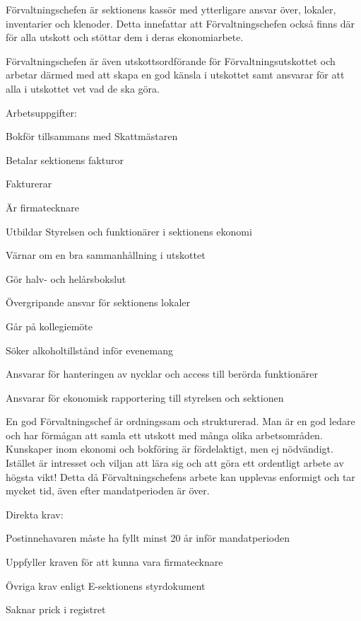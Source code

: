 \documentclass[10pt]{article}
\def\post{Förvaltningschef}
\def\doctitle{Kravprofil för \post}
\begin{document}
\heading{\doctitle}

Förvaltningschefen är sektionens kassör med ytterligare ansvar över, lokaler, inventarier och klenoder. Detta innefattar att Förvaltningschefen också finns där för alla utskott och stöttar dem i deras ekonomiarbete. 

Förvaltningschefen är även utskottsordförande för Förvaltningsutskottet och arbetar därmed med att skapa en god känsla i utskottet samt ansvarar för att alla i utskottet vet vad de ska göra.



Arbetsuppgifter:
\begin{dashlist}
    \item Bokför tillsammans med Skattmästaren
    \item Betalar sektionens fakturor
    \item Fakturerar
    \item Är firmatecknare
    \item Utbildar Styrelsen och funktionärer i sektionens ekonomi
    \item Värnar om en bra sammanhållning i utskottet
    \item Gör halv- och helårsbokslut
    \item Övergripande ansvar för sektionens lokaler
    \item Går på kollegiemöte
    \item Söker alkoholtillstånd inför evenemang
    \item Ansvarar för hanteringen av nycklar och access till berörda funktionärer
    \item Ansvarar för ekonomisk rapportering till styrelsen och sektionen
\end{dashlist}

En god Förvaltningschef är ordningssam och strukturerad. Man är en god ledare och har förmågan att samla ett utskott med många olika arbetsområden. 
Kunskaper inom ekonomi och bokföring är fördelaktigt, men ej nödvändigt. Istället är intresset och viljan att lära sig och att göra ett ordentligt arbete av högsta vikt! Detta då Förvaltningschefens arbete kan upplevas enformigt och tar mycket tid, även efter mandatperioden är över. 

Direkta krav:
\begin{dashlist}
    \item Postinnehavaren måste ha fyllt minst 20 år inför mandatperioden
    \item Uppfyller kraven för att kunna vara firmatecknare
    \item Övriga krav enligt E-sektionens styrdokument
    \item Saknar prick i registret
\end{dashlist}
\end{document}
